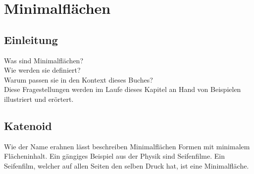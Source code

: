 \chapter{Minimalflächen\label{chapter:thema}}
\begin{refsection}

\section{Einleitung}
Was sind Minimalflächen? 
\\
Wie werden sie definiert? 
\\
Warum passen sie in den Kontext dieses Buches?
\\
Diese Fragestellungen werden im Laufe dieses Kapitel an Hand von Beispielen illustriert und erörtert.



\section{Katenoid}
Wie der Name erahnen lässt beschreiben Minimalflächen Formen mit minimalem Flächeninhalt. 
Ein gängiges Beispiel aus der Physik sind Seifenfilme. Ein Seifenfilm, welcher auf allen Seiten den selben Druck hat, ist eine Minimalfläche.

\end{refsection}

